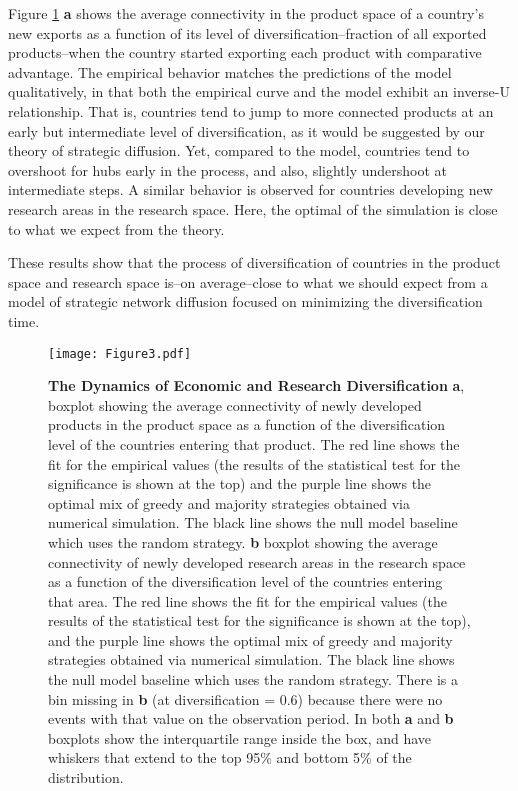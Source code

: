 \documentclass[preprint,superscriptaddress,floatfix]{article}
\begin{document}
Figure \ref{empirical} \textbf{a} shows the average connectivity in the product space of a country's new exports as a function of its level of diversification--fraction of all exported products--when the country started exporting each product with comparative advantage. The empirical behavior matches the predictions of the model qualitatively, in that both the empirical curve and the model exhibit an inverse-U relationship. That is, countries tend to jump to more connected products at an early but intermediate level of diversification, as it would be suggested by our theory of strategic diffusion. Yet, compared to the model, countries tend to overshoot for hubs early in the process, and also, slightly undershoot at intermediate steps. A similar behavior is observed for countries developing new research areas in the research space. Here, the optimal of the simulation is close to what we expect from the theory. 

These results show that the process of diversification of countries in the product space and research space is--on average--close to what we should expect from a model of strategic network diffusion focused on minimizing the diversification time.

\begin{figure}
    \centering
    \texttt{[image: Figure3.pdf]}
    \caption{\textbf{The Dynamics of Economic and Research Diversification} \textbf{a}, boxplot showing the average connectivity of newly developed products in the product space as a function of the diversification level of the countries entering that product. The red line shows the fit for the empirical values (the results of the statistical test for the significance is shown at the top) and the purple line shows the optimal mix of greedy and majority strategies obtained via numerical simulation. The black line shows the null model baseline which uses the random strategy. \textbf{b} boxplot showing the average connectivity of newly developed research areas in the research space as a function of the diversification level of the countries entering that area. The red line shows the fit for the empirical values (the results of the statistical test for the significance is shown at the top), and the purple line shows the optimal mix of greedy and majority strategies obtained via numerical simulation. The black line shows the null model baseline which uses the random strategy. There is a bin missing in \textbf{b} (at diversification = 0.6) because there were no events with that value on the observation period. In both \textbf{a} and \textbf{b} boxplots show the interquartile range inside the box, and have whiskers that extend to the top 95\% and bottom 5\% of the distribution. }
    \label{empirical}
\end{figure}
\end{document}
